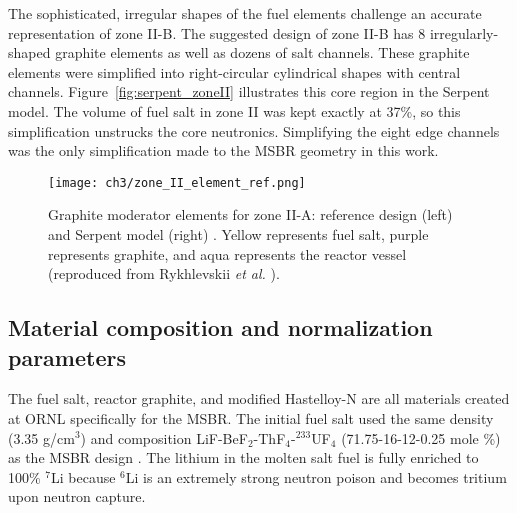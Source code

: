 The sophisticated, irregular shapes of the fuel elements challenge an accurate 
representation of zone II-B. The suggested design 
\cite{robertson_conceptual_1971} of zone II-B has 8 irregularly-shaped 
graphite elements as well as dozens of salt channels. These graphite elements 
were simplified into right-circular cylindrical shapes with central channels. 
Figure~\ref{fig:serpent_zoneII} illustrates this core region in the Serpent 
model. The volume of fuel salt in zone II was kept exactly at 37\%, so 
this simplification unstrucks the core neutronics. 
Simplifying the eight edge channels was the only simplification made to the 
\gls{MSBR} geometry in this work. 
\begin{figure}[ht!] %
	\texttt{[image: ch3/zone\_II\_element\_ref.png]}
	\caption{Graphite moderator elements for zone II-A: reference design (left)
		\cite{robertson_conceptual_1971} and Serpent model (right) 
		\cite{rykhlevskii_full-core_2017}.  Yellow 
		represents fuel salt, purple represents graphite, and aqua represents 
		the reactor vessel (reproduced from Rykhlevskii \emph{et al.} 
		\cite{rykhlevskii_modeling_2019}).}
	\label{fig:II_element_ref}
\end{figure}

\subsection{Material composition and normalization parameters}
The fuel salt, reactor graphite, and modified Hastelloy-N
are all materials created at \gls{ORNL} specifically for the \gls{MSBR}.
The initial fuel salt used the same density (3.35 g/cm$^3$) and composition 
LiF-BeF$_2$-ThF$_4$-$^{233}$UF$_4$ (71.75-16-12-0.25 mole \%) as the 
\gls{MSBR} design \cite{robertson_conceptual_1971}. The lithium in the molten 
salt fuel is fully enriched to 100\% $^{7}$Li because $^{6}$Li is an extremely 
strong neutron poison and becomes tritium upon neutron capture. 


